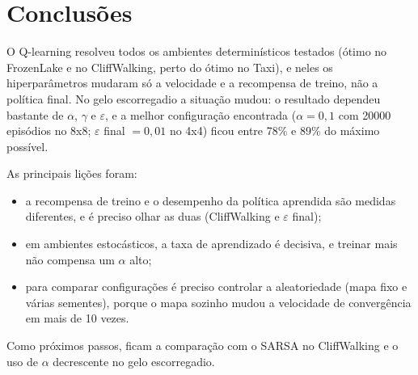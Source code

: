 \documentclass[11pt,a4paper]{article}
\begin{document}
\section{Conclusões}

O Q-learning resolveu todos os ambientes determinísticos testados (ótimo no FrozenLake e no CliffWalking, perto do
ótimo no Taxi), e neles os hiperparâmetros mudaram só a velocidade e a recompensa de treino, não a política final. No gelo escorregadio a situação mudou: o
resultado dependeu bastante de $\alpha$, $\gamma$ e $\varepsilon$, e a melhor configuração encontrada ($\alpha = 0{,}1$
com 20000 episódios no 8x8; $\varepsilon$ final $= 0{,}01$ no 4x4) ficou entre 78\% e 89\% do máximo possível.

As principais lições foram:
\begin{itemize}
  \item a recompensa de treino e o desempenho da política aprendida são medidas diferentes, e é preciso olhar as duas
    (CliffWalking e $\varepsilon$ final);
  \item em ambientes estocásticos, a taxa de aprendizado é decisiva, e treinar mais não compensa um $\alpha$ alto;
  \item para comparar configurações é preciso controlar a aleatoriedade (mapa fixo e várias sementes), porque o mapa
    sozinho mudou a velocidade de convergência em mais de 10 vezes.
\end{itemize}

Como próximos passos, ficam a comparação com o SARSA no CliffWalking e o uso de $\alpha$ decrescente no gelo
escorregadio.
\end{document}

